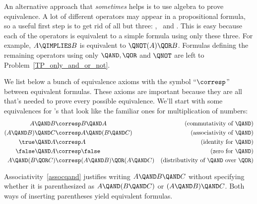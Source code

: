 An alternative approach that \emph{sometimes} helps is to use algebra
to prove equivalence.  A lot of different operators may appear in a
propositional formula, so a useful first step is to get rid of all but
three: \QAND, \QOR\ and \QNOT.  This is easy because each of the
operators is equivalent to a simple formula using only these three.
For example, $A \QIMPLIES B$ is equivalent to $\QNOT(A) \QOR B$.
Formulas defining the remaining operators using only $\QAND, \QOR$ and
$\QNOT$ are left to Problem~\ref{TP_only_and_or_not}.

We list below a bunch of equivalence axioms
with the symbol ``$\corresp$'' between equivalent formulas.  These axioms are
important because they are all that's needed to prove every possible
equivalence.  We'll start with some equivalences for \QAND's that look
like the familiar ones for multiplication of numbers:
\begin{align}
A \QAND B           &\corresp B \QAND A
         & \text{(commutativity of \QAND)}\label{commutqand}\\
(A \QAND B)\QAND C  & \corresp A \QAND (B \QAND C)
         & \text{(associativity of \QAND)}\label{assocqand}\\
\true \QAND A           &\corresp A
         & \text{(identity for \QAND)}\notag\\
\false \QAND A          &\corresp \false
         & \text{(zero for \QAND)}\notag\\
A \QAND (B \QOR C) & \corresp (A \QAND B) \QOR (A \QAND C)
         & \text{(distributivity of \QAND\ over \QOR)}\label{distand}
\end{align}

Associativity~\eqref{assocqand} justifies writing $A \QAND B \QAND C$
without specifying whether it is parenthesized as $A \QAND (B \QAND
C)$ or $(A \QAND B) \QAND C$.  Both ways of inserting parentheses
yield equivalent formulas.

\iffalse

\begin{theorem}\label{thm:distribute-and-or}[Distributive Law of $\QAND$ over $\QOR$]
\index{Distributive Law!$\QAND$ over $\QOR$|textbf}
\[
A \QAND (B \QOR C)\text{ is equivalent to } (A \QAND B) \QOR (A \QAND C).
\]
\end{theorem}
Theorem~\ref{thm:distribute-and-or} is called a \emph{distributive law}
because of its resemblance to the distributivity of products
over sums in arithmetic.
\fi

